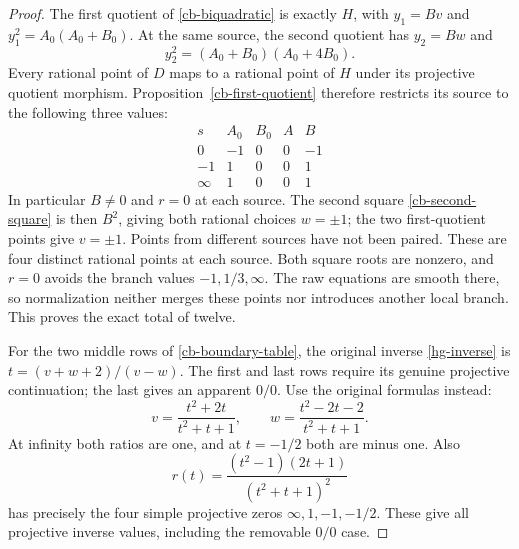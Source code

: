 \begin{proof}
The first quotient of \eqref{cb-biquadratic} is exactly \(H\),
with \(y_1=Bv\) and \(y_1^2=A_0(A_0+B_0)\).
At the same source, the second quotient has \(y_2=Bw\) and
\begin{equation}
 y_2^2=(A_0+B_0)(A_0+4B_0).
 \label{cb-second-square}
\end{equation}
Every rational point of \(D\) maps to a rational point of \(H\)
under its projective quotient morphism. Proposition~\ref{cb-first-quotient}
therefore restricts its source to the following three values:
\[
\begin{array}{c|rrrr}
 s&A_0&B_0&A&B\\\hline
 0&-1&0&0&-1\\-1&1&0&0&1\\\infty&1&0&0&1
\end{array}
\]
In particular \(B\ne0\) and \(r=0\) at each source. The second
square \eqref{cb-second-square} is then \(B^2\), giving both
rational choices \(w=\pm1\); the two first-quotient points give
\(v=\pm1\). Points from different sources have not been paired.
These are four distinct rational points at each source. Both square
roots are nonzero, and \(r=0\) avoids the branch values
\(-1,1/3,\infty\). The raw equations are smooth there, so normalization
neither merges these points nor introduces another local branch.
This proves the exact total of twelve.

For the two middle rows of \eqref{cb-boundary-table}, the original
inverse \eqref{hg-inverse} is
\(t=(v+w+2)/(v-w)\). The first and last rows require its genuine
projective continuation; the last gives an apparent \(0/0\).
Use the original formulas instead:
\[
 v=\frac{t^2+2t}{t^2+t+1},\qquad
 w=\frac{t^2-2t-2}{t^2+t+1}.
\]
At infinity both ratios are one, and at \(t=-1/2\) both are minus
one. Also
\[
 r(t)=\frac{(t^2-1)(2t+1)}{(t^2+t+1)^2}
\]
has precisely the four simple projective zeros
\(\infty,1,-1,-1/2\). These give all projective inverse values,
including the removable \(0/0\) case.
\end{proof}

